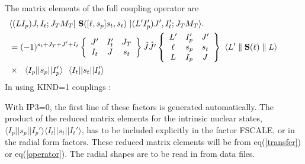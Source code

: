 \documentclass[11pt]{article}
\begin{document}
The  matrix elements of the full coupling operator are
\begin{eqnarray} 
& \langle(LI_p)J,I_t;J_TM_T | ~{\bf S}([\ell,s_p]s_t,s_t) ~| (L'I_p')J',I_t';J_TM_T \rangle.
\hspace{4cm}   \nonumber \\
& =  (-1)^{s_t+J_T+J'+I_t}
   \left\{ \begin{array}{ccc}
    J'  & I_t' & J_T \\
    I_t & J    & s_t \\
    \end{array} \right\}   \hat{J} \hat{J'}
    \left\{ \begin{array}{ccc}
    L' & I_p' & J'  \\
    \ell & s_p & s_t  \\
    L & I_p & J  \\
    \end{array} \right\}  ~   \langle L' \parallel {\bf S}(\ell)  \parallel L \rangle  
     \nonumber \\
   &  \times ~~ 
       \langle I_p||s_p||I_p'\rangle ~~ \langle I_t||s_t||I_t'\rangle
\end{eqnarray}
In using KIND=1 couplings :

With IP3=0, the first line of these factors is generated automatically. 
The product of the
reduced matrix elements for the intrinsic nuclear states,
$\langle I_p||s_p||I_p'\rangle \langle I_t||s_t||I_t'\rangle$,
 has to be included explicitly in the factor FSCALE,
 or in the radial form factors.
These reduced matrix elements will be from eq(\ref{transfer}) or eq(\ref{operator}). 
The radial shapes are to be read in from data files.
\\
\end{document}
